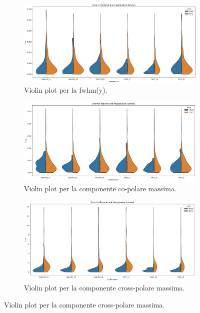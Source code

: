 \documentclass[12pt,a4paper,final]{book}
\begin{document}
\begin{figure}[!ht]\ContinuedFloat
	\begin{subfigure}{\textwidth}
		\centering
		\includegraphics[width=\linewidth]{../figures/violin_plot_fwhmy.png}
		\caption{Violin plot per la fwhm(y).}
		\label{violin_fwhmy}
	\end{subfigure}
	\newline
	\begin{subfigure}{\textwidth}
	    \centering
	    \includegraphics[width=\linewidth]{../figures/violin_plot_comax.png}
	    \caption{Violin plot per la componente co-polare massima.}
	    \label{violin_comax}
	\end{subfigure}
	\newline
	\begin{subfigure}{\textwidth}
		\centering
	    \includegraphics[width=\linewidth]{../figures/violin_plot_cxmax.png}
	    \caption{Violin plot per la componente cross-polare massima.}
	    \label{violin_cxmax}
	\end{subfigure}
\end{figure}
\end{document}
